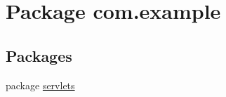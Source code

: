 \hypertarget{namespacecom_1_1example}{}\section{Package com.\+example}
\label{namespacecom_1_1example}
\subsection*{Packages}
\begin{DoxyCompactItemize}
\item 
package \hyperlink{namespacecom_1_1example_1_1servlets}{servlets}
\end{DoxyCompactItemize}
